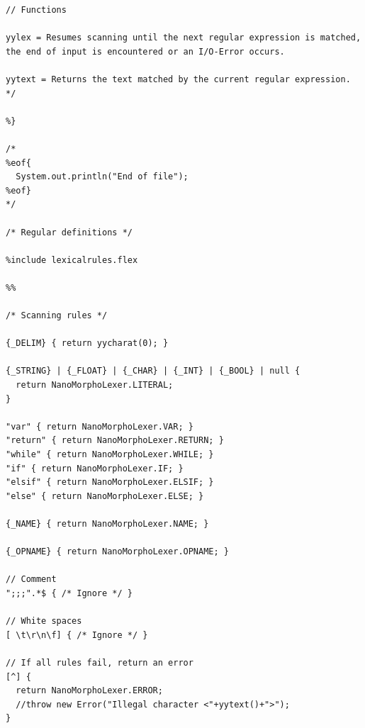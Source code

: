 \documentclass{homework}
\begin{document}
\begin{answer}
\begin{verbatim}
// Functions

yylex = Resumes scanning until the next regular expression is matched, the end of input is encountered or an I/O-Error occurs.

yytext = Returns the text matched by the current regular expression.
*/

%}

/*
%eof{
  System.out.println("End of file");
%eof}
*/

/* Regular definitions */

%include lexicalrules.flex

%%

/* Scanning rules */

{_DELIM} { return yycharat(0); }

{_STRING} | {_FLOAT} | {_CHAR} | {_INT} | {_BOOL} | null {
  return NanoMorphoLexer.LITERAL;
}

"var" { return NanoMorphoLexer.VAR; }
"return" { return NanoMorphoLexer.RETURN; }
"while" { return NanoMorphoLexer.WHILE; }
"if" { return NanoMorphoLexer.IF; }
"elsif" { return NanoMorphoLexer.ELSIF; }
"else" { return NanoMorphoLexer.ELSE; }

{_NAME} { return NanoMorphoLexer.NAME; }

{_OPNAME} { return NanoMorphoLexer.OPNAME; }

// Comment
";;;".*$ { /* Ignore */ }

// White spaces
[ \t\r\n\f] { /* Ignore */ }

// If all rules fail, return an error
[^] {
  return NanoMorphoLexer.ERROR;
  //throw new Error("Illegal character <"+yytext()+">");
}
  \end{verbatim}
\end{answer}
\end{document}
